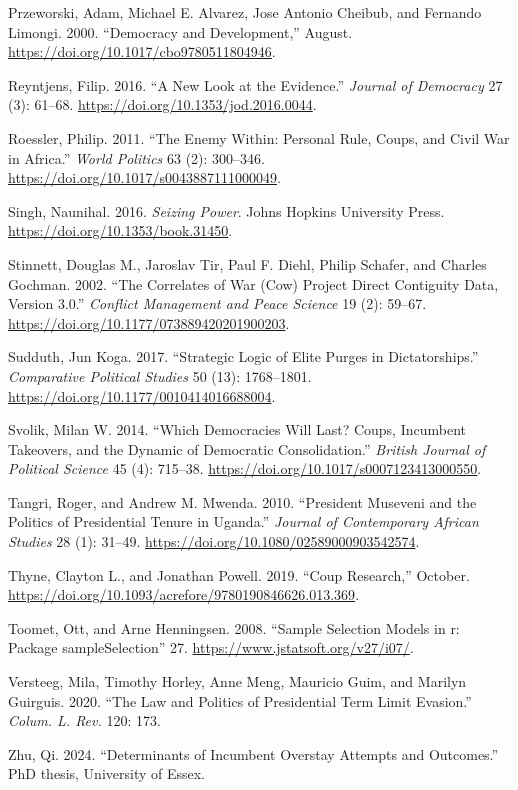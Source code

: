 \documentclass[
  12pt,
]{report}
\newlength{\cslhangindent}
\newenvironment{CSLReferences}[2] %
 {\begin{list}{}{%
  \setlength{\itemindent}{0pt}
  \setlength{\leftmargin}{0pt}
  \setlength{\parsep}{0pt}
  \ifodd #1
   \setlength{\leftmargin}{\cslhangindent}
   \setlength{\itemindent}{-1\cslhangindent}
  \fi
  \setlength{\itemsep}{#2\baselineskip}}}
 {\end{list}}
\begin{document}
\begin{CSLReferences}{1}{0}
Przeworski, Adam, Michael E. Alvarez, Jose Antonio Cheibub, and Fernando
Limongi. 2000. {``Democracy and Development,''} August.
\url{https://doi.org/10.1017/cbo9780511804946}.

Reyntjens, Filip. 2016. {``A New Look at the Evidence.''} \emph{Journal
of Democracy} 27 (3): 61--68.
\url{https://doi.org/10.1353/jod.2016.0044}.

Roessler, Philip. 2011. {``The Enemy Within: Personal Rule, Coups, and
Civil War in Africa.''} \emph{World Politics} 63 (2): 300--346.
\url{https://doi.org/10.1017/s0043887111000049}.

Singh, Naunihal. 2016. \emph{Seizing Power}. Johns Hopkins University
Press. \url{https://doi.org/10.1353/book.31450}.

Stinnett, Douglas M., Jaroslav Tir, Paul F. Diehl, Philip Schafer, and
Charles Gochman. 2002. {``The Correlates of War (Cow) Project Direct
Contiguity Data, Version 3.0.''} \emph{Conflict Management and Peace
Science} 19 (2): 59--67.
\url{https://doi.org/10.1177/073889420201900203}.

Sudduth, Jun Koga. 2017. {``Strategic Logic of Elite Purges in
Dictatorships.''} \emph{Comparative Political Studies} 50 (13):
1768--1801. \url{https://doi.org/10.1177/0010414016688004}.

Svolik, Milan W. 2014. {``Which Democracies Will Last? Coups, Incumbent
Takeovers, and the Dynamic of Democratic Consolidation.''} \emph{British
Journal of Political Science} 45 (4): 715--38.
\url{https://doi.org/10.1017/s0007123413000550}.

Tangri, Roger, and Andrew M. Mwenda. 2010. {``President Museveni and the
Politics of Presidential Tenure in Uganda.''} \emph{Journal of
Contemporary African Studies} 28 (1): 31--49.
\url{https://doi.org/10.1080/02589000903542574}.

Thyne, Clayton L., and Jonathan Powell. 2019. {``Coup Research,''}
October. \url{https://doi.org/10.1093/acrefore/9780190846626.013.369}.

Toomet, Ott, and Arne Henningsen. 2008. {``Sample Selection Models in
{\textbraceleft}r{\textbraceright}: Package
{\textbraceleft}sampleSelection{\textbraceright}''} 27.
\url{https://www.jstatsoft.org/v27/i07/}.

Versteeg, Mila, Timothy Horley, Anne Meng, Mauricio Guim, and Marilyn
Guirguis. 2020. {``The Law and Politics of Presidential Term Limit
Evasion.''} \emph{Colum. L. Rev.} 120: 173.

Zhu, Qi. 2024. {``Determinants of Incumbent Overstay Attempts and
Outcomes.''} PhD thesis, University of Essex.

\end{CSLReferences}
\end{document}
